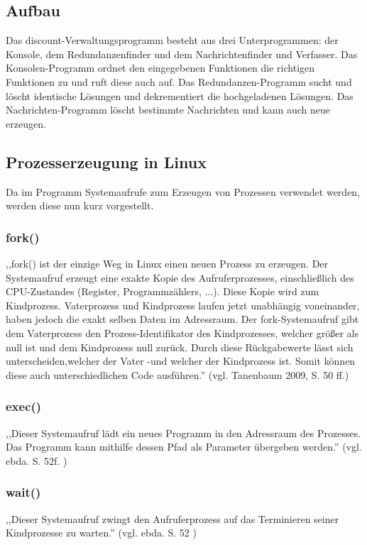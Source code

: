 \documentclass[12pt]{report}
\begin{document}
\subsection{Aufbau}
Das discount-Verwaltungsprogramm besteht aus drei Unterprogrammen: der Konsole, dem Redundanzenfinder und dem Nachrichtenfinder und Verfasser. Das Konsolen-Programm ordnet den eingegebenen Funktionen die richtigen Funktionen zu und ruft diese auch auf. Das Redundanzen-Programm sucht und löscht identische Lösungen und dekrementiert die hochgeladenen Lösungen. Das Nachrichten-Programm löscht bestimmte Nachrichten und kann auch neue erzeugen.

\subsection{Prozesserzeugung in Linux}
Da im Programm Systemaufrufe zum Erzeugen von Prozessen verwendet werden, werden diese nun kurz vorgestellt.

\subsubsection{fork()}
,,fork() ist der einzige Weg in Linux einen neuen Prozess zu erzeugen. Der Systemaufruf erzeugt eine exakte Kopie des Aufruferprozesses, einschließlich des CPU-Zustandes (Register, Programmzählers, ...). Diese Kopie wird zum Kindprozess. Vaterprozess und Kindprozess laufen jetzt unabhängig voneinander, haben jedoch die exakt selben Daten im Adressraum. Der fork-Systemaufruf gibt dem Vaterprozess den Prozess-Identifikator des Kindprozesses, welcher größer als null ist und dem Kindprozess null zurück. Durch diese Rückgabewerte lässt sich unterscheiden,welcher der Vater -und welcher der Kindprozess ist. Somit können diese auch unterschiedlichen Code ausführen.'' (vgl. Tanenbaum 2009, S. 50 ff.\nocite{OS})

\subsubsection{exec()}
,,Dieser Systemaufruf lädt ein neues Programm in den Adressraum des Prozesses. Das Programm kann mithilfe dessen Pfad als Parameter übergeben werden.'' (vgl. ebda. S. 52f. \nocite{OS})

\subsubsection{wait()}
,,Dieser Systemaufruf zwingt den Aufruferprozess auf das Terminieren seiner Kindprozesse zu warten.'' (vgl. ebda. S. 52 \nocite{OS})
\end{document}
